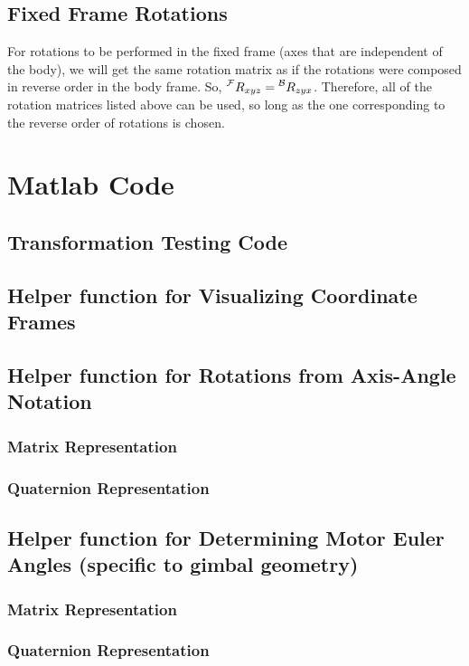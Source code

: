 \documentclass[letterpaper,10pt]{article}
\newcommand\leftidx[3]{%
  {\vphantom{#2}}#1#2#3%
}
\begin{document}
\subsection{Fixed Frame Rotations}
For rotations to be performed in the fixed frame (axes that are independent of the body), we will get the same rotation matrix as if the rotations were composed in reverse order in the body frame. So, $\leftidx{^\mathcal{F}}{R}{_{xyz}} = \leftidx{^\mathcal{B}}{R}{_{zyx}}$. Therefore, all of the rotation matrices listed above can be used, so long as the one corresponding to the reverse order of rotations is chosen.

\clearpage
\section{Matlab Code}
\subsection{Transformation Testing Code}


\subsection{Helper function for Visualizing Coordinate Frames}


\subsection{Helper function for Rotations from Axis-Angle Notation}
\subsubsection{Matrix Representation}

\subsubsection{Quaternion Representation}



\subsection{Helper function for Determining Motor Euler Angles (specific to gimbal geometry)}
\subsubsection{Matrix Representation}

\subsubsection{Quaternion Representation}

\end{document}
